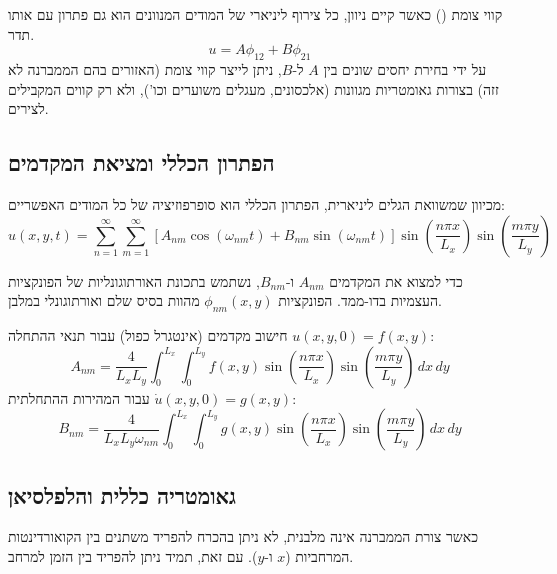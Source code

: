\begin{notebox}{קווי צומת ()}
כאשר קיים ניוון, כל צירוף ליניארי של המודים המנוונים הוא גם פתרון עם אותו תדר.
\begin{equation}
u = A \phi_{12} + B \phi_{21}
\end{equation}
על ידי בחירת יחסים שונים בין $A$ ל-$B$, ניתן לייצר קווי צומת (האזורים בהם הממברנה לא זזה) בצורות גאומטריות מגוונות (אלכסונים, מעגלים משוערים וכו'), ולא רק קווים המקבילים לצירים.
\end{notebox}

\subsection{הפתרון הכללי ומציאת המקדמים}

מכיוון שמשוואת הגלים ליניארית, הפתרון הכללי הוא סופרפוזיציה של כל המודים האפשריים:
\begin{equation}
u(x,y,t) = \sum_{n=1}^{\infty} \sum_{m=1}^{\infty} \left[ A_{nm} \cos(\omega_{nm} t) + B_{nm} \sin(\omega_{nm} t) \right] \sin\left( \frac{n\pi x}{L_x} \right) \sin\left( \frac{m\pi y}{L_y} \right)
\end{equation}

כדי למצוא את המקדמים $A_{nm}$ ו-$B_{nm}$, נשתמש בתכונת האורתוגונליות של הפונקציות העצמיות בדו-ממד.
הפונקציות $\phi_{nm}(x,y)$ מהוות בסיס שלם ואורתוגונלי במלבן.

\begin{formulabox}{חישוב מקדמים (אינטגרל כפול)}
עבור תנאי ההתחלה $u(x,y,0) = f(x,y)$:
\begin{equation}
A_{nm} = \frac{4}{L_x L_y} \int_{0}^{L_x} \int_{0}^{L_y} f(x,y) \sin\left( \frac{n\pi x}{L_x} \right) \sin\left( \frac{m\pi y}{L_y} \right) \, dx \, dy
\end{equation}
עבור המהירות ההתחלתית $\dot{u}(x,y,0) = g(x,y)$:
\begin{equation}
B_{nm} = \frac{4}{L_x L_y \omega_{nm}} \int_{0}^{L_x} \int_{0}^{L_y} g(x,y) \sin\left( \frac{n\pi x}{L_x} \right) \sin\left( \frac{m\pi y}{L_y} \right) \, dx \, dy
\end{equation}
\end{formulabox}

\subsection{גאומטריה כללית והלפלסיאן}

כאשר צורת הממברנה אינה מלבנית, לא ניתן בהכרח להפריד משתנים בין הקואורדינטות המרחביות ($x$ ו-$y$). עם זאת, תמיד ניתן להפריד בין הזמן למרחב.

